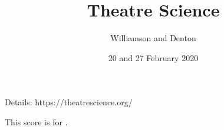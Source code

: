 \documentclass[17pt]{extarticle}
\title{Theatre Science}
\author{Williamson and Denton}
\date{20 and 27 February 2020}
\begin{document}
\maketitle

\vfill

Details: https://theatrescience.org/

\ccby

This score is for \textbf{\performerletter{\speaker}}. %



\newpage

\tableofcontents

\newpage


\end{document}
